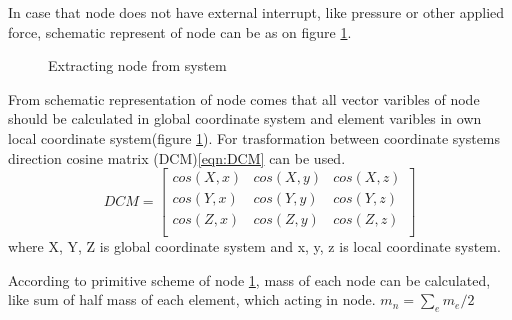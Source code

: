 In case that node does not have external interrupt, like pressure or other
applied force, schematic represent of node can be as on figure
\ref{fig:nodeExtract}.\par
\begin{figure}[ht]
  \centering
      
  \caption{Extracting node from system}\label{fig:nodeExtract}
\end{figure}
From schematic representation of node comes that all vector varibles of node
should be calculated in global coordinate system and element varibles in own
local coordinate system(figure \ref{fig:nodeExtract}). For trasformation between
coordinate systems direction cosine matrix (DCM)\eqref{eqn:DCM} can be used.
\begin{equation}\label{eqn:DCM}
  DCM= \begin{bmatrix}
    cos(X,x)&cos(X,y)&cos(X,z)\\
    cos(Y,x)&cos(Y,y)&cos(Y,z)\\
    cos(Z,x)&cos(Z,y)&cos(Z,z)\\
   \end{bmatrix} 
\end{equation}
where {X, Y, Z} is global coordinate system and {x, y, z} is local coordinate
system.\par According to primitive scheme of node \ref{fig:nodeExtract}, mass of
each node can be calculated, like sum of half mass of each element, which acting
in node. $m_n=\sum_{e}m_e/2$\par